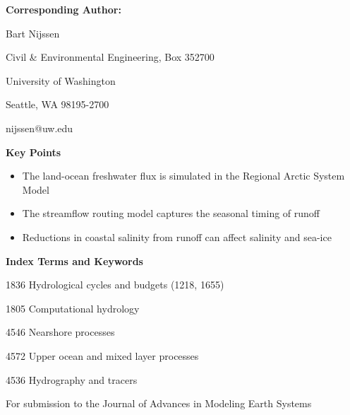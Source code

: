 \textbf{Corresponding Author: }

Bart Nijssen

Civil & Environmental Engineering, Box 352700

University of Washington

Seattle, WA 98195-2700

nijssen@uw.edu

\textbf{Key Points}
 
\begin{itemize}
\item The land-ocean freshwater flux is simulated in the Regional Arctic System Model
\item The streamflow routing model captures the seasonal timing of runoff
\item Reductions in coastal salinity from runoff can affect salinity and sea-ice
\end{itemize}

\textbf{Index Terms and Keywords}

1836 Hydrological cycles and budgets (1218, 1655)

1805 Computational hydrology

4546 Nearshore processes

4572 Upper ocean and mixed layer processes

4536 Hydrography and tracers

\centerline{For submission to the Journal of Advances in Modeling Earth Systems}
